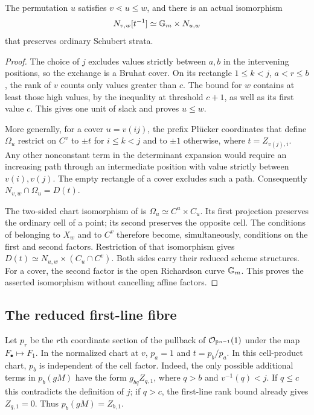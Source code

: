 \begin{lemma}\label{ta:open}
The permutation $u$ satisfies $v\lessdot u\leq w$, and there is an actual
isomorphism
\[
 N_{v,w}[t^{-1}]\simeq\mathbb G_m\times N_{u,w}
\]
that preserves ordinary Schubert strata.
\end{lemma}

\begin{proof}
The choice of $j$ excludes values strictly between $a,b$ in the intervening
positions, so the exchange is a Bruhat cover. On its rectangle
$1\leq k<j$, $a<r\leq b$, the rank of $v$ counts only values greater than
$c$. The bound for $w$ contains at least those high values, by the
inequality at threshold $c+1$, as well as its first value $c$. This gives
one unit of slack and proves $u\leq w$.

More generally, for a cover $u=v(ij)$, the prefix Pl\"ucker coordinates
that define $\Omega_u$ restrict on $C^v$ to $\pm t$ for $i\leq k<j$ and
to $\pm1$ otherwise, where $t=Z_{v(j),i}$. Any other nonconstant term in
the determinant expansion would require an increasing path through an
intermediate position with value strictly between $v(i),v(j)$. The empty
rectangle of a cover excludes such a path. Consequently
$N_{v,w}\cap\Omega_u=D(t)$.

The two-sided chart isomorphism of \cite[Lemma 2.1]{KWY13} is
$\Omega_u\simeq C^u\times C_u$. Its first projection preserves the
ordinary cell of a point; its second preserves the opposite cell.
The conditions of belonging to $X_w$ and to $C^v$ therefore become,
simultaneously, conditions on the first and second factors. Restriction
of that isomorphism gives
$D(t)\simeq N_{u,w}\times(C_u\cap C^v)$.
Both sides carry their reduced scheme structures. For a cover, the second
factor is the open Richardson curve $\mathbb G_m$. This proves
the asserted isomorphism without cancelling affine factors.
\end{proof}

\subsection{The reduced first-line fibre}

Let $p_r$ be the $r$th coordinate section of the pullback of
$\mathcal O_{\mathbb P^{n-1}}(1)$ under the map $F_\bullet\mapsto F_1$.
In the normalized chart at $v$, $p_a=1$ and $t=p_b/p_a$.
In this cell-product chart, $p_b$ is independent of the cell factor.
Indeed, the only possible additional terms in $p_b(gM)$ have the form
$g_{bq}Z_{q,1}$, where $q>b$ and $v^{-1}(q)<j$. If $q\leq c$ this
contradicts the definition of $j$; if $q>c$, the first-line rank bound
already gives $Z_{q,1}=0$. Thus $p_b(gM)=Z_{b,1}$.

